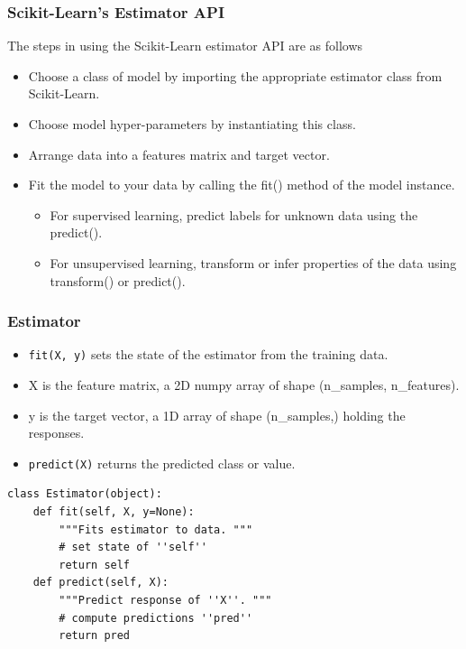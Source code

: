 \begin{frame}[fragile]\frametitle{Scikit-Learn's Estimator API}
The steps in using the Scikit-Learn estimator API are as follows
\begin{itemize}
\item Choose a class of model by importing the appropriate estimator class from Scikit-Learn.
\item Choose model hyper-parameters by instantiating this class.
\item Arrange data into a features matrix and target vector.
\item Fit the model to your data by calling the fit() method of the model instance.
\begin{itemize}
    \item For supervised learning, predict labels for unknown data using the predict().
    \item For unsupervised learning, transform or infer properties of the data using transform() or predict().
\end{itemize}
\end{itemize}
\end{frame}

\begin{frame}[fragile]\frametitle{Estimator}

\begin{itemize}
\item \texttt{fit(X, y)} sets the state of the estimator from the training data.
\item X is the feature matrix, a 2D numpy array of shape (n\_samples, n\_features).
\item y is the target vector, a 1D array of shape (n\_samples,) holding the responses.
\item \texttt{predict(X)} returns the predicted class or value.
\end{itemize}

\begin{lstlisting}
class Estimator(object):
    def fit(self, X, y=None):
        """Fits estimator to data. """
        # set state of ''self''
        return self
    def predict(self, X):
        """Predict response of ''X''. """
        # compute predictions ''pred''
        return pred
\end{lstlisting}
\end{frame}

